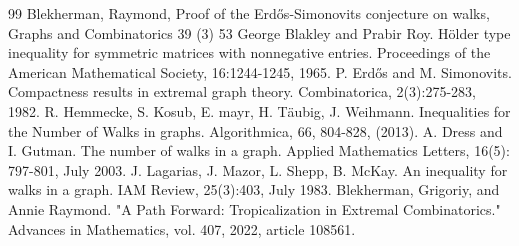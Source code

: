 \documentclass[11pt,a4paper]{article}
\begin{document}
\begin{thebibliography}{99}
 Blekherman, Raymond, Proof of the Erd\H{o}s-Simonovits conjecture on walks, Graphs and Combinatorics 39 (3) 53
 George Blakley and Prabir Roy. H\"older type inequality for symmetric matrices with nonnegative entries. Proceedings of the American Mathematical Society, 16:1244-1245, 1965.
 P. Erd\H{o}s and M. Simonovits. Compactness results in extremal graph theory. Combinatorica, 2(3):275-283, 1982.
 R. Hemmecke, S. Kosub, E. mayr, H. T\"aubig, J. Weihmann. Inequalities for the Number of Walks in graphs. Algorithmica, 66, 804-828, (2013).
 A. Dress and I. Gutman. The number of walks in a graph. Applied Mathematics Letters, 16(5): 797-801, July 2003.
 J. Lagarias, J. Mazor, L. Shepp, B. McKay. An inequality for walks in a graph. IAM Review, 25(3):403, July 1983.
 Blekherman, Grigoriy, and Annie Raymond. "A Path Forward: Tropicalization in Extremal Combinatorics." Advances in Mathematics, vol. 407, 2022, article 108561.
\end{thebibliography}
\end{document}
